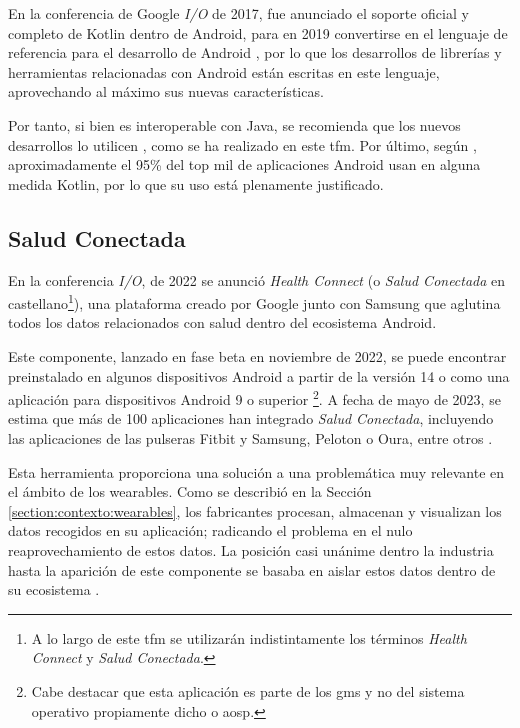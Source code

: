         En la conferencia de Google \textit{I/O} de 2017, fue anunciado el soporte oficial y completo de Kotlin dentro de Android, para en 2019 convertirse en el lenguaje de referencia para el desarrollo de Android \cite{braun_celebrating_2022}, por lo que los desarrollos de librerías y herramientas relacionadas con Android están escritas en este lenguaje, aprovechando al máximo sus nuevas características. 
        
        Por tanto, si bien es interoperable con Java, se recomienda que los nuevos desarrollos lo utilicen \cite{lardinois_kotlin_2019}, como se ha realizado en este \gls{tfm}. Por último, según \cite{kotlin_help_kotlin_nodate}, aproximadamente el 95\% del top mil de aplicaciones Android usan en alguna medida Kotlin, por lo que su uso está plenamente justificado.
        
    \subsection{Salud Conectada}
        \label{section:salud_conectada}
        En la conferencia \textit{I/O}, de 2022 se anunció \textit{Health Connect} (o \textit{Salud Conectada} en castellano\footnote{A lo largo de este \gls{tfm} se utilizarán indistintamente los términos \textit{Health Connect} y \textit{Salud Conectada}.}), una plataforma creado por Google junto con Samsung \cite{wilk_introducing_2022} que aglutina todos los datos relacionados con salud dentro del ecosistema Android. 
        
        Este componente, lanzado en fase beta en noviembre de 2022, se puede encontrar preinstalado en algunos dispositivos Android a partir de la versión 14 \cite{ayuda_de_android_informacion_nodate} o como una aplicación para dispositivos Android 9 o superior \cite{pandey_health_2023} \footnote{Cabe destacar que esta aplicación es parte de los \gls{gms} y no del sistema operativo propiamente dicho o \gls{aosp}.}. A fecha de mayo de 2023, se estima que más de 100 aplicaciones han integrado \textit{Salud Conectada}, incluyendo las aplicaciones de las pulseras Fitbit y Samsung, Peloton o Oura, entre otros \cite{malik_googles_2023}.
        
        Esta herramienta proporciona una solución a una problemática muy relevante en el ámbito de los \glspl{wearable}. Como se describió en la Sección \ref{section:contexto:wearables}, los fabricantes procesan, almacenan y visualizan los datos recogidos en su aplicación; radicando el problema en el nulo reaprovechamiento de estos datos. La posición casi unánime dentro la 
        industria hasta la aparición de este componente se basaba en aislar estos datos  dentro de su ecosistema \cite{ramirez_android_2022} \cite{rahman_android_2023}. 
        
